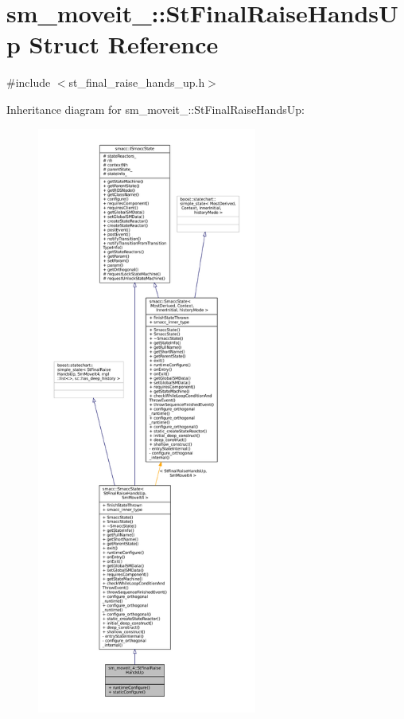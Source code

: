 \hypertarget{structsm__moveit__4_1_1StFinalRaiseHandsUp}{}\section{sm\+\_\+moveit\+\_\+:\+:St\+Final\+Raise\+Hands\+Up Struct Reference}
\label{structsm__moveit__4_1_1StFinalRaiseHandsUp}


{\ttfamily \#include $<$st\+\_\+final\+\_\+raise\+\_\+hands\+\_\+up.\+h$>$}



Inheritance diagram for sm\+\_\+moveit\+\_\+:\+:St\+Final\+Raise\+Hands\+Up\+:
\nopagebreak
\begin{figure}[H]
\begin{center}
\leavevmode
\includegraphics[height=550pt]{structsm__moveit__4_1_1StFinalRaiseHandsUp__inherit__graph}
\end{center}
\end{figure}


